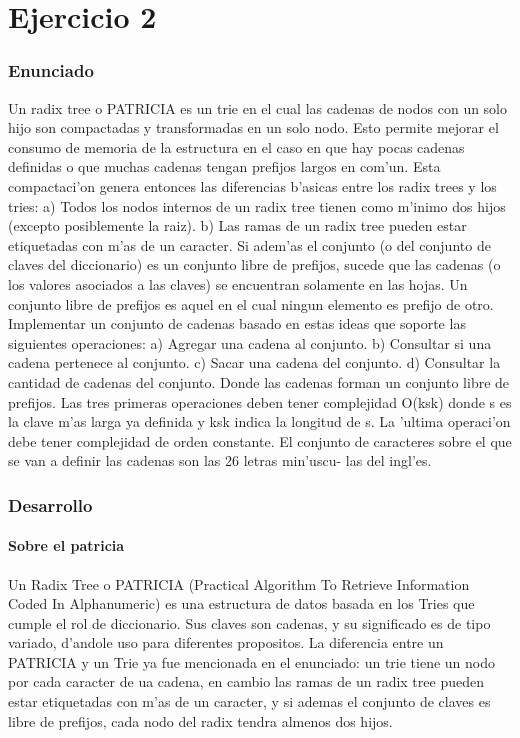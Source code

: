 \part{Ejercicio 2}
\section{Enunciado}
Un radix tree o PATRICIA es un trie en el cual las cadenas de nodos con un solo hijo
son compactadas y transformadas en un solo nodo. Esto permite mejorar el consumo de
memoria de la estructura en el caso en que hay pocas cadenas definidas o que muchas
cadenas tengan prefijos largos en com'un.
Esta compactaci'on genera entonces las diferencias b'asicas entre los radix trees y los tries:
a) Todos los nodos internos de un radix tree tienen como m'inimo dos hijos (excepto
posiblemente la raiz).
b) Las ramas de un radix tree pueden estar etiquetadas con m'as de un caracter.
Si adem'as el conjunto (o del conjunto de claves del diccionario) es un conjunto libre
de prefijos, sucede que las cadenas (o los valores asociados a las claves) se encuentran
solamente en las hojas. Un conjunto libre de prefijos es aquel en el cual ningun elemento
es prefijo de otro.
Implementar un conjunto de cadenas basado en estas ideas que soporte las siguientes
operaciones:
a) Agregar una cadena al conjunto.
b) Consultar si una cadena pertenece al conjunto.
c) Sacar una cadena del conjunto.
d) Consultar la cantidad de cadenas del conjunto.
Donde las cadenas forman un conjunto libre de prefijos. Las tres primeras operaciones
deben tener complejidad O(ksk) donde s es la clave m'as larga ya definida y ksk indica la
longitud de s. La 'ultima operaci'on debe tener complejidad de orden constante.
El conjunto de caracteres sobre el que se van a definir las cadenas son las 26 letras min'uscu-
las del ingl'es.

\section{Desarrollo}
\subsection{Sobre el patricia}
Un Radix Tree o PATRICIA (Practical Algorithm To Retrieve Information Coded In Alphanumeric) es una estructura de datos basada en los Tries que cumple el rol de diccionario. Sus claves son cadenas, y su significado es de tipo variado, d'andole uso para diferentes propositos. La diferencia entre un PATRICIA y un Trie ya fue mencionada en el enunciado: un trie tiene un nodo por cada caracter de ua cadena, en cambio las ramas de un radix tree pueden estar etiquetadas con m'as de un caracter, y si ademas el conjunto de claves es libre de prefijos, cada nodo del radix tendra almenos dos hijos.

